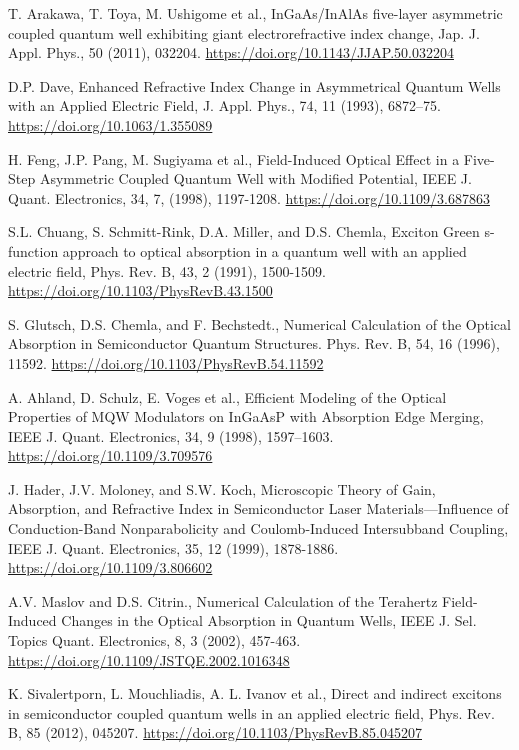 \documentclass[a4paper,14pt]{extarticle}
\begin{document}
\begin{thebibliography}{99}
     T. Arakawa, T. Toya, M. Ushigome et al., InGaAs/InAlAs five-layer asymmetric coupled quantum well exhibiting giant electrorefractive index change, Jap. J. Appl. Phys., 50 (2011), 032204. \url{https://doi.org/10.1143/JJAP.50.032204}
    
     D.P. Dave, Enhanced Refractive Index Change in Asymmetrical Quantum Wells with an Applied Electric Field, J. Appl. Phys., 74, 11 (1993), 6872–75. \url{https://doi.org/10.1063/1.355089}
    
     H. Feng, J.P. Pang, M. Sugiyama et al., Field-Induced Optical Effect in a Five-Step Asymmetric Coupled Quantum Well with Modified Potential, IEEE J. Quant. Electronics, 34, 7, (1998), 1197-1208. \url{https://doi.org/10.1109/3.687863}
    
     S.L. Chuang, S. Schmitt-Rink, D.A. Miller, and D.S. Chemla, Exciton Green s-function approach to optical absorption in a quantum well with an applied electric field, Phys. Rev. B, 43, 2 (1991), 1500-1509. \url{https://doi.org/10.1103/PhysRevB.43.1500}
    
     S. Glutsch, D.S. Chemla, and F. Bechstedt., Numerical Calculation of the Optical Absorption in Semiconductor Quantum Structures. Phys. Rev. B, 54, 16 (1996), 11592. \url{https://doi.org/10.1103/PhysRevB.54.11592}
    
     A. Ahland, D. Schulz, E. Voges et al., Efficient Modeling of the Optical Properties of MQW Modulators on InGaAsP with Absorption Edge Merging, IEEE J. Quant. Electronics, 34, 9 (1998), 1597–1603. \url{https://doi.org/10.1109/3.709576}
    
     J. Hader, J.V. Moloney, and S.W. Koch, Microscopic Theory of Gain, Absorption, and Refractive Index in Semiconductor Laser Materials—Influence of Conduction-Band Nonparabolicity and Coulomb-Induced Intersubband Coupling, IEEE J. Quant. Electronics, 35, 12 (1999), 1878-1886. \url{https://doi.org/10.1109/3.806602}
    
     A.V. Maslov and D.S. Citrin., Numerical Calculation of the Terahertz Field-Induced Changes in the Optical Absorption in Quantum Wells, IEEE J. Sel. Topics Quant. Electronics, 8, 3 (2002), 457-463. \url{https://doi.org/10.1109/JSTQE.2002.1016348}
    
     K. Sivalertporn, L. Mouchliadis, A. L. Ivanov et al., Direct and indirect excitons in semiconductor coupled quantum wells in an applied electric field, Phys. Rev. B, 85 (2012), 045207. \url{https://doi.org/10.1103/PhysRevB.85.045207}
    

\end{thebibliography}
\end{document}
